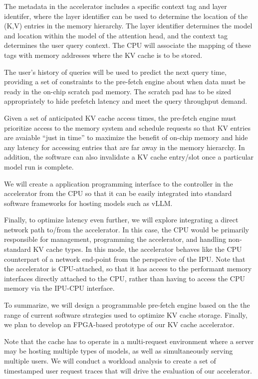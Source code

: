 \documentclass[11pt]{article}
\begin{document}
The metadata in the accelerator includes a specific context tag and
layer identifer, where the layer identifier can be used to determine
the location of the (K,V) entries in the memory hierarchy. The layer
identifier determines the model and location within the model of the
attention head, and the context tag determines the user query context.
The CPU will associate the mapping of these tags with memory addresses
where the KV cache is to be stored.

The user's history of queries will be used to predict the next query
time, providing a set of constraints to the pre-fetch engine about
when data must be ready in the on-chip scratch pad memory. The scratch
pad has to be sized appropriately to hide prefetch latency and meet
the query throughput demand.

Given a set of anticipated KV cache access times, the pre-fetch engine
must prioritize access to the memory system and schedule requests so
that KV entries are avaiable ``just in time'' to maximize the benefit
of on-chip memory and hide any latency for accessing entries that are
far away in the memory hierarchy. In addition, the software can also
invalidate a KV cache entry/slot once a particular model run is
complete. 

We will create a application programming interface to the
controller in the accelerator from the CPU so that it can be easily
integrated into standard software frameworks for hosting models such
as vLLM.

Finally, to optimize latency even further, we will explore integrating
a direct network path to/from the accelerator. In this case, the CPU
would be primarily responsible for management, programming the
accelerator, and handling non-standard KV cache types. In this mode,
the accelerator behaves like the CPU counterpart of a network
end-point from the perspective of the IPU. Note that the accelerator
is CPU-attached, so that it has access to the performant memory
interfaces directly attached to the CPU, rather than having to access
the CPU memory via the IPU-CPU interface.

To summarize, we will design a programmable pre-fetch engine based on
the the range of current software strategies used to optimize KV cache
storage.  Finally, we plan to develop an FPGA-based prototype of our
KV cache accelerator.

Note that the cache has to operate in a multi-request environment
where a server may be hosting multiple types of models, as well as
simultaneously serving multiple users. We will conduct a workload
analysis to create a set of timestamped user request traces that will
drive the evaluation of our accelerator.
\end{document}
